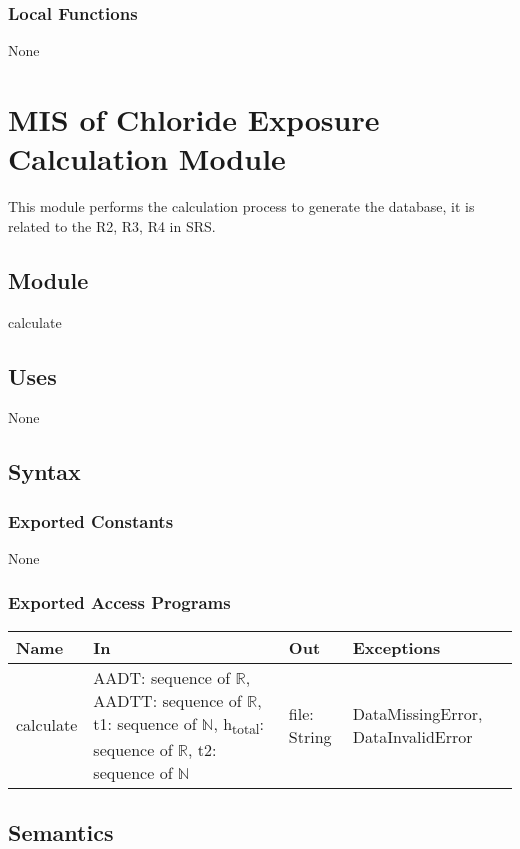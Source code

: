 \documentclass[12pt, titlepage]{article}
\begin{document}
\subsubsection{Local Functions}
None
\newpage

\section{MIS of Chloride Exposure Calculation Module} \label{calculationModule}
This module performs the calculation process to generate the database, it is related to the R2, R3, R4 in SRS.

\subsection{Module}

calculate

\subsection{Uses}

None

\subsection{Syntax}

\subsubsection{Exported Constants}
None
\subsubsection{Exported Access Programs}

\begin{center}
\begin{tabular}{p{2cm} p{4cm} p{4cm} p{4cm}}
\hline
\textbf{Name} & \textbf{In} & \textbf{Out} & \textbf{Exceptions} \\
\hline
calculate & AADT: sequence of $\mathbb{R}$, AADTT: sequence of $\mathbb{R}$, t1: sequence of $\mathbb{N}$, h\textsubscript{total}: sequence of $\mathbb{R}$, t2: sequence of $\mathbb{N}$ & file: String & DataMissingError, DataInvalidError \\
\hline
\end{tabular}
\end{center}

\subsection{Semantics}
\end{document}

